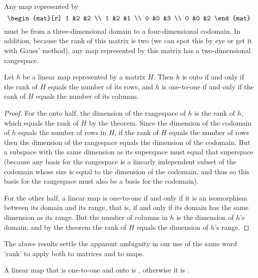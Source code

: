 \begin{example}
Any map represented by
\begin{equation*}
    \begin{mat}[r]
      1  &2  &2  \\
      1  &2  &1  \\
      0  &0  &3  \\
      0  &0  &2
    \end{mat}
\end{equation*}
must be from a three-dimensional domain
to a four-dimensional codomain.
In addition, because the rank of this matrix is two 
(we can spot this by eye or get it with Gauss' method),
any map represented by this matrix has a two-dimensional rangespace.
\end{example}

\begin{corollary} \label{cor:MatDescsMap}
Let $h$ be a linear map represented by a matrix $H$.
Then $h$ is onto if and only if the rank of $H$ equals the number 
of its rows, 
and $h$ is one-to-one if and only if the rank of $H$ equals the number of
its columns.
\end{corollary}

\begin{proof}
For the onto half, the dimension of the rangespace of $h$ is the rank of $h$,
which equals the rank of $H$ by the theorem.
Since the dimension of the codomain of $h$ equals the number of rows in $H$,
if the rank of $H$ equals the number of rows then the dimension of the
rangespace equals the dimension of the codomain.
But a subspace with the same dimension as its superspace must equal
that superspace
(because any basis for the rangespace is a linearly independent subset 
of the codomain
whose size is equal to the dimension of the codomain, and thus so this 
basis for the rangespace must also be 
a basis for the codomain).

For the other half, 
a linear map is one-to-one if and only if it is an isomorphism
between its domain and its range, that is, if and only if its domain has the
same dimension as its range.
But the number of columns in $h$ is the dimension of $h$'s domain, and
by the theorem the rank of $H$ equals the dimension of 
$h$'s range.
\end{proof}

The above results settle the apparent ambiguity in our use of the same
word `rank' to apply both to matrices and to maps.

\begin{definition}
A linear map that is one-to-one and onto is 
%
, otherwise it is 
%
.
\end{definition}

